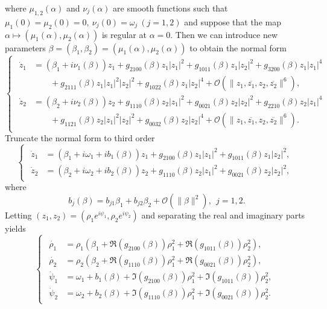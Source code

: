 where $\mu_{1,2}(\alpha)$ and $\nu_{j}(\alpha)$ are smooth functions such that $\mu_1(0)=\mu_2(0)=0, \ \nu_{j}(0)=\omega_{j}\  (j=1,2)$ and suppose that the map $\alpha\mapsto(\mu_{1}(\alpha),\mu_{2}(\alpha))$ is regular at $\alpha=0$. Then we can introduce new parameters $\beta=(\beta_{1},\beta_{2})=(\mu_1(\alpha),\mu_2(\alpha))$ to obtain the normal form
\[
\begin{cases}
\begin{aligned}
\dot{z}_{1} & =(\beta_{1}+i\nu_{1}(\beta))z_{1}+g_{2100}(\beta)z_{1}|z_{1}|^{2}+g_{1011}(\beta)z_{1}|z_{2}|^{2}+g_{3200}(\beta)z_{1}|z_{1}|^{4}\\
 & \qquad+g_{2111}(\beta)z_{1}|z_{1}|^{2}|z_{2}|^{2}+g_{1022}(\beta)z_{1}|z_{2}|^{4}+\mathcal{O}\left(\|z_{1},\overline{z_{1}},z_{2},\overline{z_{2}}\|^{6}\right),\\
\dot{z}_{2} & =(\beta_{2}+i\nu_{2}(\beta))z_{2}+g_{1110}(\beta)z_{2}|z_{1}|^{2}+g_{0021}(\beta)z_{2}|z_{2}|^{2}+g_{2210}(\beta)z_{2}|z_{1}|^{4}\\
 & \qquad+g_{1121}(\beta)z_{2}|z_{1}|^{2}|z_{2}|^{2}+g_{0032}(\beta)z_{2}|z_{2}|^{4}+\mathcal{O}\left(\|z_{1},\overline{z_{1}},z_{2},\overline{z_{2}}\|^{6}\right).
\end{aligned}
\end{cases}
\]
Truncate the normal form to third order
\begin{equation}
\begin{cases}
\begin{aligned}
\dot{z}_{1} & =\left(\beta_{1}+i\omega_{1}+ib_1(\beta)\right)z_{1}+g_{2100}(\beta)z_{1}|z_{1}|^{2}+g_{1011}(\beta)z_{1}|z_{2}|^{2},\\
\dot{z}_{2} & =\left(\beta_{2}+i\omega_{2}+ib_2(\beta)\right)z_{2}+g_{1110}(\beta)z_{2}|z_{1}|^{2}+g_{0021}(\beta)z_{2}|z_{2}|^{2},
\end{aligned}
\end{cases}\label{switch:eq:HH_nf-1}
\end{equation}
where
\begin{equation}
b_j(\beta)=b_{j1}\beta_1+b_{j2}\beta_2 + \mathcal O(\|\beta\|^2),\ \ j =1,2.
\label{switch:Eq:nu_expand}    
\end{equation}
Letting $\left(z_{1},z_{2}\right)=\left(\rho_{1}e^{i\psi_{1}},\rho_{2}e^{i\psi_{2}}\right)$
and separating the real and imaginary parts yields
\begin{equation}
\begin{cases}
\begin{aligned}
\dot{\rho_{1}}& = \rho_{1}\left(\beta_{1}+\Re(g_{2100}(\beta))\rho_{1}^{2}+\Re(g_{1011}(\beta))\rho_{2}^{2}\right),\\
\dot{\rho_{2}}& = \rho_{2}\left(\beta_{2}+\Re(g_{1110}(\beta))\rho_{1}^{2}+\Re(g_{0021}(\beta))\rho_{2}^{2}\right),\\
\dot{\psi}_{1}& = \omega_{1}+b_1(\beta)+\Im(g_{2100}(\beta))\rho_{1}^{2}+\Im(g_{1011}(\beta))\rho_{2}^{2},\\
\dot{\psi}_{2}& = \omega_{2}+b_2(\beta)+\Im(g_{1110}(\beta))\rho_{1}^{2}+\Im(g_{0021}(\beta))\rho_{2}^{2}.
\end{aligned}
\end{cases}\label{switch:eq:HH-polor_coordinates}
\end{equation}
